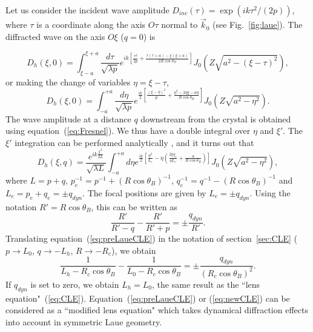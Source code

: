 \documentclass[preprint]{iucr}              %
\begin{document}
Let us consider the incident wave amplitude $D_{inc}(\tau)=\exp(i k \tau^2/(2p))$, where $\tau$ is a coordinate along the axis $O\tau$ normal to $\vec k_0$ (see Fig.~\ref{fig:laue}). The diffracted wave on the axis $O\xi$
($q=0$) is

\begin{equation}
    D_h(\xi,0)=\int_{\xi-a}^{\xi+a}\frac{d\tau}{\sqrt{\lambda p}}
    e^{ik\left[\frac{\tau^2}{2p}+\frac{\tau(\tau+a)-\xi(\xi+a)}{2R \cos\theta_B}\right]}
    J_0(Z\sqrt{a^2-(\xi-\tau)^2}),
\end{equation}
or making the change of variables $\eta=\xi-\tau$,
\begin{equation}
    D_h(\xi,0)=\int_{-a}^{+a}\frac{d\eta}{\sqrt{\lambda p}}
    e^{\frac{ik}{2}\left[\frac{(\xi-\eta)^2}{p}+\frac{\eta^2-2\eta\xi-a\eta}{R \cos\theta_B}\right]}
    J_0(Z\sqrt{a^2-\eta^2}).
\end{equation}
The wave amplitude at a distance $q$ downstream from the crystal is obtained using equation~(\ref{eq:Fresnel}). We thus have a double integral over $\eta$ and $\xi'$. The $\xi'$ integration can be performed analytically \cite{GuigayFerrero2013}, and it turns out that
\begin{equation}
\label{eq:Dhpropagated}
    D_h(\xi,q)=
    \frac{e^{i k \frac{\xi^2}{2L}}}{\sqrt{\lambda L}}
    \int_{-a}^{+a} d\eta
    e^{\frac{ik}{2}
    [\frac{\eta^2}{L_e}-\eta(
    \frac{2\xi q_e}{q L_e}+
    \frac{a}{R \cos\theta_B}
    )]}
    J_0(Z\sqrt{a^2-\eta^2}),
\end{equation}
where $L=p+q$, $p_e^{-1}=p^{-1}+(R\cos\theta_B)^{-1}$, $q_e^{-1}=q^{-1}-(R\cos\theta_B)^{-1}$ and $L_e=p_e+q_e=\pm q_{dyn}$. The focal positions are given by $L_{e}=\pm q_{dyn}$. Using the notation $R'=R\cos\theta_B$, this can be written as
\begin{equation}
\label{eq:preLaueCLE}
    \frac{R'}{R'-q} - \frac{R'}{R' + p} = \pm \frac{q_{dyn}}{R'}.
\end{equation}
Translating equation~(\ref{eq:preLaueCLE}) in the notation of section~\ref{sec:CLE} ($p \to L_0$, $q \to -L_h$, $R \to -R_c$), we obtain
\begin{equation}
\label{eq:newCLE}
    \frac{1}{L_h-R_c \cos\theta_B} -
    \frac{1}{L_0 - R_c \cos\theta_B} =
    \pm \frac{q_{dyn}}{(R_c \cos\theta_B)^2}.
\end{equation}
If $q_{dyn}$ is set to zero, we obtain $L_h=L_0$, the same result as the ``lens equation"~(\ref{eq:CLE}).
Equation~(\ref{eq:preLaueCLE}) or (\ref{eq:newCLE}) can be considered as a ``modified lens equation" which takes dynamical diffraction effects into account in symmetric Laue geometry.
\end{document}
